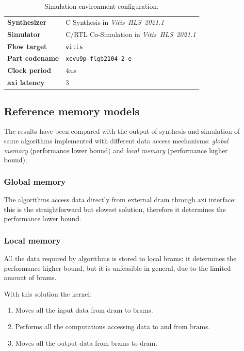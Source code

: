 \documentclass[11pt,a4paper,oneside]{memoir}
\begin{document}
\begin{table}[!htb]
	\begin{center}
		\begin{tabular}{ll}
			\hline
			\rowcolor{gray!25}
			\textbf{Synthesizer} & C Synthesis in
			\emph{Vitis\texttrademark~HLS~2021.1} \\
			\textbf{Simulator} & C/RTL Co-Simulation in
			\emph{Vitis\texttrademark~HLS~2021.1} \\
			\rowcolor{gray!25}
			\textbf{Flow target} & \texttt{vitis} \\
			\textbf{Part codename} & \texttt{xcvu9p-flgb2104-2-e} \\
			\rowcolor{gray!25}
			\textbf{Clock period} & $4 ns$ \\
			\textbf{\ac{axi} latency} & 3 \\
			\hline
		\end{tabular}
	\end{center}
	\caption{Simulation environment configuration.}
	\label{tab:sim_config}
\end{table}

\subsection{Reference memory models}
The results have been compared with the output of synthesis and simulation of
same algorithms implemented with different data access mechanisms: \emph{global
memory} (performance lower bound) and \emph{local memory} (performance higher
bound).

\subsubsection{Global memory}
The algorithms access data directly from external \ac{dram} through \ac{axi}
interface: this is the straightforward but slowest solution, therefore it
determines the performance lower bound.

\subsubsection{Local memory}
All the data required by algorithms is stored to local \acp{bram}: it determines
the performance higher bound, but it is unfeasible in general, due to the
limited amount of \acp{bram}.

With this solution the kernel:
\begin{enumerate}
	\item Moves all the input data from \ac{dram} to \acp{bram}.
	\item Performs all the computations accessing data to and from
		\acp{bram}. 
	\item Moves all the output data from \acp{bram} to \ac{dram}.
\end{enumerate}
\end{document}
